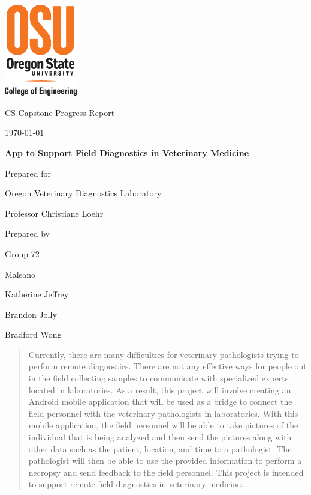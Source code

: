 \documentclass[onecolumn, draftclsnofoot,10pt, compsoc]{IEEEtran}
\def \CapstoneTeamName{		Malsano}
\def \CapstoneTeamNumber{		72}
\def \GroupMemberOne{			Katherine Jeffrey}
\def \GroupMemberTwo{			Brandon Jolly}
\def \GroupMemberThree{			Bradford Wong}
\def \CapstoneProjectName{		App to Support Field Diagnostics in Veterinary Medicine}
\def \CapstoneSponsorCompany{	Oregon Veterinary Diagnostics Laboratory}
\def \CapstoneSponsorPerson{		Professor Christiane Loehr}
\def \DocType{		%
				Progress Report
				}
\newcommand{\NameSigPair}[1]{\par
\makebox[2.75in][r]{#1} \hfil 	\makebox[3.25in]{\makebox[2.25in]{\hrulefill} \hfill		\makebox[.75in]{\hrulefill}}
\par\vspace{-12pt} \textit{\tiny\noindent
\makebox[2.75in]{} \hfil		\makebox[3.25in]{\makebox[2.25in][r]{Signature} \hfill	\makebox[.75in][r]{Date}}}}
\renewcommand{\NameSigPair}[1]{#1}
\begin{document}
\begin{titlepage}
    \begin{singlespace}
    	\includegraphics[height=4cm]{coe_v_spot1}
        \hfill 
        \par\vspace{.2in}
        \centering
        \scshape{
            \huge CS Capstone \DocType \par
            {\large\today}\par
            \vspace{.5in}
            \textbf{\Huge\CapstoneProjectName}\par
            \vfill
            {\large Prepared for}\par
            \Huge \CapstoneSponsorCompany\par
            \vspace{5pt}
            {\Large\NameSigPair{\CapstoneSponsorPerson}\par}
            {\large Prepared by }\par
            Group\CapstoneTeamNumber\par
            \CapstoneTeamName\par 
            \vspace{5pt}
            {\Large
                \NameSigPair{\GroupMemberOne}\par
                \NameSigPair{\GroupMemberTwo}\par
                \NameSigPair{\GroupMemberThree}\par
            }
            \vspace{20pt}
        }
        \begin{abstract}
        	Currently, there are many difficulties for veterinary pathologists trying to perform remote diagnostics. There are not any effective ways for people out in the field collecting samples to communicate with specialized experts located in laboratories. As a result, this project will involve creating an Android mobile application that will be used as a bridge to connect the field personnel with the veterinary pathologists in laboratories. With this mobile application, the field personnel will be able to take pictures of the individual that is being analyzed and then send the pictures along with other data such as the patient, location, and time to a pathologist. The pathologist will then be able to use the provided information to perform a necropsy and send feedback to the field personnel. This project is intended to support remote field diagnostics in veterinary medicine.

\end{abstract}
\end{singlespace}
\end{titlepage}
\end{document}
